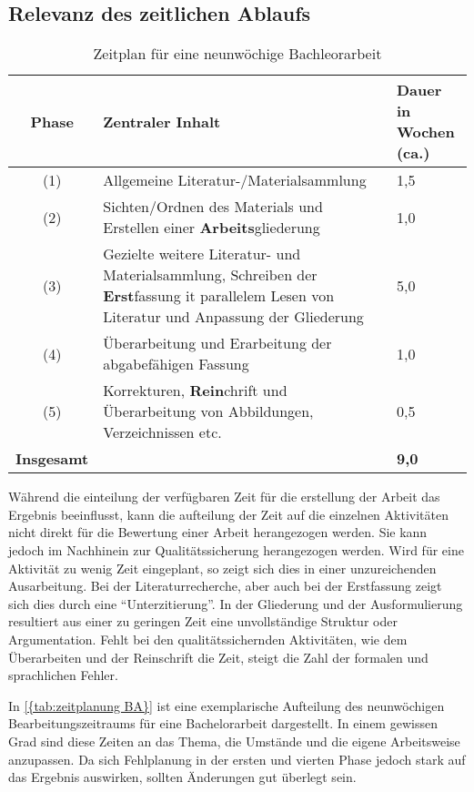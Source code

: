 \subsection{Relevanz des zeitlichen Ablaufs}
\begin{table}[!b]
    \begin{tabular}{c p{9cm} p{3cm}}
        
        \textbf{Phase} & \textbf{Zentraler Inhalt} & \parbox[c]{3cm}{\textbf{Dauer in\\ Wochen (ca.)}} \\ \hline
        (1) & Allgemeine Literatur-/Materialsammlung & 1,5 \\
        (2) & Sichten/Ordnen des Materials und Erstellen einer \textbf{Arbeits}gliederung & 1,0 \\
        (3) & Gezielte weitere Literatur- und Materialsammlung, Schreiben der \textbf{Erst}fassung it parallelem Lesen von Literatur und Anpassung der Gliederung  & 5,0 \\
        (4) & Überarbeitung und Erarbeitung der abgabefähigen Fassung & 1,0 \\
        (5) & Korrekturen, \textbf{Rein}chrift und Überarbeitung von Abbildungen, Verzeichnissen etc. & 0,5 \\
        \textbf{Insgesamt} & & \textbf{9,0}
    \end{tabular}
    \caption{Zeitplan für eine neunwöchige Bachleorarbeit\cite[entnommen aus][]{Baensch:2013}}\label{{tab:zeitplanung BA}}
\end{table}
Während die einteilung der verfügbaren Zeit für die erstellung der Arbeit das Ergebnis beeinflusst, kann die aufteilung der Zeit auf die einzelnen Aktivitäten nicht direkt für die Bewertung einer Arbeit herangezogen werden. Sie kann jedoch im Nachhinein zur Qualitätssicherung herangezogen werden. Wird für eine Aktivität zu wenig Zeit eingeplant, so zeigt sich dies in einer unzureichenden Ausarbeitung. Bei der Literaturrecherche, aber auch bei der Erstfassung zeigt sich dies durch eine \enquote{Unterzitierung}. In der Gliederung und der Ausformulierung resultiert aus einer zu geringen Zeit eine unvollständige Struktur oder Argumentation. Fehlt bei den qualitätssichernden Aktivitäten, wie dem Überarbeiten und der Reinschrift die Zeit, steigt die Zahl der formalen und sprachlichen Fehler. 

In \autoref{{tab:zeitplanung BA}} ist eine exemplarische Aufteilung des neunwöchigen Bearbeitungszeitraums für eine Bachelorarbeit dargestellt. In einem gewissen Grad sind diese Zeiten an das Thema, die Umstände und die eigene Arbeitsweise anzupassen. Da sich Fehlplanung in der ersten und vierten Phase jedoch stark auf das Ergebnis auswirken, sollten Änderungen gut überlegt sein.\cite[Vgl.][S. 49 f.]{Baensch:2013}

